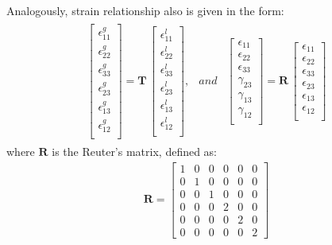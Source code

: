 \documentclass[materials,article,submit,moreauthors,pdftex]{Definitions/mdpi}
\begin{document}
Analogously, strain relationship also is given in the form:
\begin{eqnarray}
\begin{array}{ccc}
\left [
\begin{array}{c}
\epsilon^g_{11}\\
\epsilon^g_{22}\\ 
\epsilon^g_{33}\\ 
\epsilon^g_{23}\\
\epsilon^g_{13}\\
\epsilon^g_{12}\\
\end{array}
\right ]=
\textbf{T}\,\left [
\begin{array}{c}
\epsilon^l_{11}\\
\epsilon^l_{22}\\ 
\epsilon^l_{33}\\
\epsilon^l_{23}\\
\epsilon^l_{13}\\
\epsilon^l_{12}\\
\end{array}
\right ], & and & \left [
\begin{array}{c}
\epsilon_{11}\\
\epsilon_{22}\\ 
\epsilon_{33}\\ 
\gamma_{23}\\
\gamma_{13}\\
\gamma_{12}\\
\end{array}
\right ]=
\textbf{R}\,\left [
\begin{array}{c}
\epsilon_{11}\\
\epsilon_{22}\\ 
\epsilon_{33}\\
\epsilon_{23}\\
\epsilon_{13}\\
\epsilon_{12}\\
\end{array}
\right ]
\end{array}
\label{eq:strain}
\end{eqnarray}
where \(\textbf{R}\) is the Reuter's matrix, defined as:
\begin{eqnarray}
\textbf{R} = \left [
\begin{array}{cccccc}
1 & 0 & 0 & 0 & 0 & 0\\
0 & 1 & 0 & 0 & 0 & 0\\
0 & 0  & 1 & 0 & 0 & 0\\
0 & 0 & 0 & 2 & 0 & 0\\
0 & 0 & 0 & 0 & 2 & 0\\
0 & 0 & 0 & 0 & 0 & 2
\end{array}
\right ]
\label{eq:reuters}
\end{eqnarray}
\end{document}

